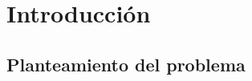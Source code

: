 
\chapter{Introducción}
\label{chapter:intro}

\section{Planteamiento del problema}
\label{section:planteamiento}


